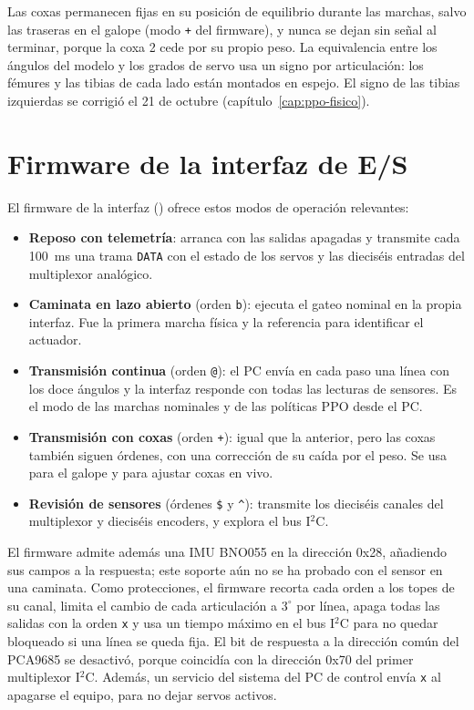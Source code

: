Las coxas permanecen fijas en su posición de equilibrio durante las
marchas, salvo las traseras en el galope (modo \texttt{+} del firmware), y nunca se dejan sin señal al terminar, porque la coxa 2 cede por su
propio peso. La equivalencia entre los ángulos del modelo y los grados de servo
usa un signo por articulación: los fémures y las tibias de cada lado están
montados en espejo. El signo de las tibias izquierdas se corrigió el 21 de
octubre (capítulo~\ref{cap:ppo-fisico}).

\section{Firmware de la interfaz de E/S}

El firmware de la interfaz () ofrece estos
modos de operación relevantes:
\begin{itemize}
    \item \textbf{Reposo con telemetría}: arranca con las salidas apagadas y
    transmite cada 100~ms una trama \texttt{DATA} con el estado de los servos y
    las dieciséis entradas del multiplexor analógico.
    \item \textbf{Caminata en lazo abierto} (orden \texttt{b}): ejecuta el gateo
    nominal en la propia interfaz. Fue la primera marcha física y la referencia para
    identificar el actuador.
    \item \textbf{Transmisión continua} (orden \texttt{@}): el PC envía en cada
    paso una línea con los doce ángulos y la interfaz responde con todas las
    lecturas de sensores. Es el modo de las marchas nominales y de las políticas
    PPO desde el PC.
    \item \textbf{Transmisión con coxas} (orden \texttt{+}): igual que la anterior,
    pero las coxas también siguen órdenes, con una corrección de su caída por el peso.
    Se usa para el galope y para ajustar coxas en vivo.
    \item \textbf{Revisión de sensores} (órdenes \texttt{\$} y \texttt{\^{}}): transmite
    los dieciséis canales del multiplexor y dieciséis encoders, y explora el bus I$^2$C.
\end{itemize}
El firmware admite además una IMU BNO055 en la dirección 0x28, añadiendo sus campos
a la respuesta; este soporte aún no se ha probado con el sensor en una caminata.
Como protecciones, el firmware recorta cada orden a los topes de su canal,
limita el cambio de cada articulación a $3^\circ$ por línea, apaga todas las
salidas con la orden \texttt{x} y usa un tiempo máximo en el bus I$^2$C para no
quedar bloqueado si una línea se queda fija. El bit de respuesta a la dirección
común del PCA9685 se desactivó, porque coincidía con la dirección 0x70 del
primer multiplexor I$^2$C. Además, un servicio del sistema del PC de control envía
\texttt{x} al apagarse el equipo, para no dejar servos activos.

